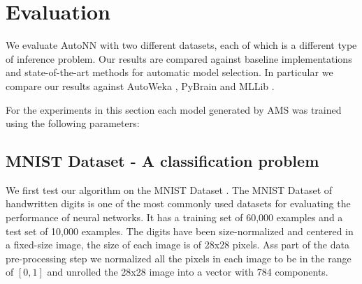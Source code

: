 \documentclass[journal]{IEEEtran}
\begin{document}
\section{Evaluation}
\label{sec:evaluation}

We evaluate AutoNN with two different datasets, each of which is a different type of inference problem. Our results are compared against baseline implementations and state-of-the-art methods for automatic model selection. In particular we compare our results against AutoWeka \cite{Thornton2016}, PyBrain \cite{Schaul2010} and MLLib \cite{mlib2017}.

For the experiments in this section each model generated by AMS was trained using the following parameters:

\begin{table}[!htb]
\begin{center}
\end{center}
\caption{Training parameters for each of the used datasets.}
\label{table:training_params}
\end{table}

\subsection{MNIST Dataset - A classification problem}

We first test our algorithm on the MNIST Dataset \cite{Lecun2010}. The MNIST Dataset of handwritten digits is one of the most commonly used datasets for evaluating the performance of neural networks. It has a training set of 60,000 examples and a test set of 10,000 examples. The digits have been size-normalized and centered in a fixed-size image, the size of each image is of 28x28 pixels. Ass part of the data pre-processing step we normalized all the pixels in each image to be in the range of $[0,1]$ and unrolled the 28x28 image into a vector with 784 components.
\end{document}
